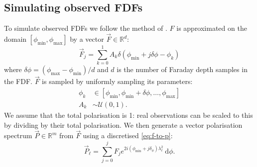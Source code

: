   \subsection{Simulating observed FDFs}
  \label{sec:faraday-simulated-fdfs}

    To simulate observed FDFs we follow the method of \citet{brown_classifying_2018}. $F$ is approximated on the domain $[\phi_{\min}, \phi_{\max}]$ by a vector $\vec F \in \mathbb R^d$:
    \begin{equation}
      \label{eq:faraday-vec-f}
      \vec F_j = \sum_{k = 0}^1 A_k \delta(\phi_{\min} + j \delta \phi - \phi_k)
    \end{equation}
    where $\delta\phi = (\phi_{\max} - \phi_{\min}) / d$ and $d$ is the number of Faraday depth samples in the FDF.
    $\vec F$ is sampled by uniformly sampling its parameters:
    \begin{align}
      \label{eq:faraday-model-distributions}
      \phi_k &\in [\phi_{\min}, \phi_{\min} + \delta\phi, \dots, \phi_{\max}]\\
      A_k &\sim \mathcal U(0, 1).
    \end{align}
    We assume that the total polarisation is 1: real observations can be scaled to this by dividing by their total polarisation. We then generate a vector polarisation spectrum $\vec P \in \mathbb R^m$ from $\vec F$ using a discretised \autoref{eq:f-to-p}:
    \begin{equation}
      \label{eq:faraday-discrete-f-to-p}
      \vec P_\ell = \sum_{j = 0}^{j} F_j e^{2i(\phi_{\min} + j\delta_\phi)\lambda^2_\ell}\ \mathrm{d}\phi.
    \end{equation}
